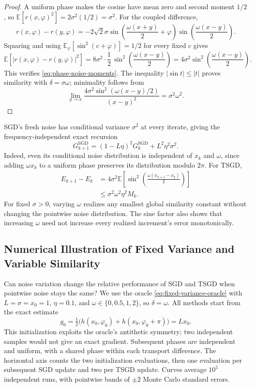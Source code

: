 \begin{proof}
A uniform phase makes the cosine have mean zero and second moment
$1/2$, so
$\mathbb E[r(x,\varphi)^2]=2\sigma^2(1/2)=\sigma^2$.
For the coupled difference,
\[
r(x,\varphi)-r(y,\varphi)
=-2\sqrt2\sigma
\sin\!\left(\frac{\omega(x+y)}2+\varphi\right)
\sin\!\left(\frac{\omega(x-y)}2\right).
\]
Squaring and using
$\mathbb E_\varphi[\sin^2(c+\varphi)]=1/2$ for every fixed $c$ gives
\[
\mathbb E[|r(x,\varphi)-r(y,\varphi)|^2]
=8\sigma^2\cdot\frac12\,
  \sin^2\!\left(\frac{\omega(x-y)}2\right)
=4\sigma^2\sin^2\!\left(\frac{\omega(x-y)}2\right).
\]
This verifies \eqref{eq:phase-noise-moments}.
The inequality $|\sin t|\leq|t|$ proves similarity with
$\delta=\sigma\omega$; minimality follows from
\[
\lim_{y\to x}
\frac{4\sigma^2\sin^2(\omega(x-y)/2)}{(x-y)^2}
=\sigma^2\omega^2.
\]
\end{proof}

SGD's fresh noise has conditional variance $\sigma^2$ at every
iterate, giving the frequency-independent exact recursion
\begin{equation}
\label{eq:phase-sgd-dynamics}
G_{k+1}^{\mathrm{SGD}}
=(1-L\eta)^2G_k^{\mathrm{SGD}}+L^2\eta^2\sigma^2.
\end{equation}
Indeed, even its conditional noise distribution is independent of
$x_k$ and $\omega$, since adding $\omega x_k$ to a uniform phase
preserves its distribution modulo $2\pi$. For TSGD,
\begin{equation}
\label{eq:phase-tsgd-error}
\begin{aligned}
E_{k+1}-E_k
&=4\sigma^2\mathbb E\!\left[
\sin^2\!\left(\frac{\omega(x_{k+1}-x_k)}2\right)\right]\\
&\leq\sigma^2\omega^2\eta^2M_k.
\end{aligned}
\end{equation}
For fixed $\sigma>0$, varying $\omega$ realizes any smallest global
similarity constant without changing the pointwise noise distribution.
The sine factor also shows that
increasing $\omega$ need not increase every realized increment's
error monotonically.

\subsection{Numerical Illustration of Fixed Variance and Variable Similarity}
\label{app:sinusoid}
\label{app:numerical-details}

Can noise variation change the relative performance of SGD and TSGD
when pointwise noise stays the same? We use the oracle
\eqref{eq:fixed-variance-oracle} with $L=\sigma=x_0=1$,
$\eta=0.1$, and $\omega\in\{0,0.5,1,2\}$, so $\delta=\omega$.
All methods start from the exact estimate
\[
g_0=\tfrac12\bigl(h(x_0,\varphi_0)+h(x_0,\varphi_0+\pi)\bigr)=Lx_0.
\]
This initialization exploits the oracle's antithetic symmetry; two
independent samples would not give an exact gradient. Subsequent phases
are independent and uniform, with a shared phase within each transport
difference. The horizontal axis counts the two initialization
evaluations, then one evaluation per subsequent SGD update and two
per TSGD update. Curves average $10^5$ independent runs, with pointwise
bands of $\pm2$ Monte Carlo standard errors.

